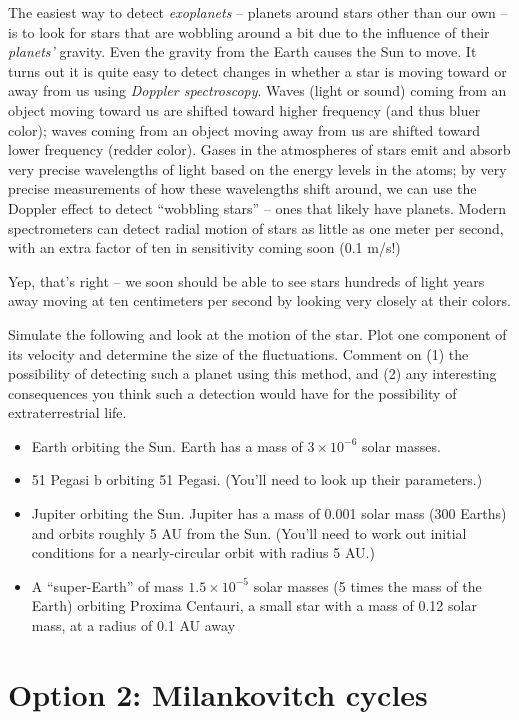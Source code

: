 \documentclass[12pt]{article}
\begin{document}
The easiest way to detect {\it exoplanets} -- planets around stars other than our own -- is to look for stars that are wobbling around a bit due to the influence of their {\it planets'} gravity. Even the gravity from the Earth causes the Sun to move. 
It turns out it is quite easy to detect changes in whether a star is moving toward or away from us using {\it Doppler spectroscopy}. Waves (light or sound) coming from an object moving toward us are shifted toward higher frequency (and thus bluer color); 
waves coming from an object moving away from us are shifted toward lower frequency (redder color). Gases in the atmospheres of stars emit and absorb very precise wavelengths of light based on the energy levels in the atoms; by very precise measurements of how these
wavelengths shift around, we can use the Doppler effect to detect ``wobbling stars'' -- ones that likely have planets. Modern spectrometers can detect radial motion of stars as little as one meter per second, with an extra factor of ten in sensitivity coming soon
(0.1 m/s!)

Yep, that's right -- we soon should be able to see stars hundreds of light years away moving at ten centimeters per second by looking very closely at their colors. 

Simulate the following and look at the motion of the star. Plot one component of its velocity and determine the size of the fluctuations. Comment on (1) the possibility of detecting such a planet using this method, and (2) any interesting consequences you think
such a detection would have for the possibility of extraterrestrial life.

\begin{itemize}
\item Earth orbiting the Sun. Earth has a mass of $3 \times 10^{-6}$ solar masses.
\item 51 Pegasi b orbiting 51 Pegasi. (You'll need to look up their parameters.) 
\item Jupiter orbiting the Sun. Jupiter has a mass of 0.001 solar mass (300 Earths) and orbits roughly 5 AU from the Sun. (You'll need to work out initial conditions for a nearly-circular orbit with radius 5 AU.)
\item A ``super-Earth'' of mass $1.5 \times 10^{-5}$ solar masses (5 times the mass of the Earth) orbiting Proxima Centauri, a small star with a mass of 0.12 solar mass, at a radius of 0.1 AU away
\end{itemize}

\section{Option 2: Milankovitch cycles}
\end{document}
